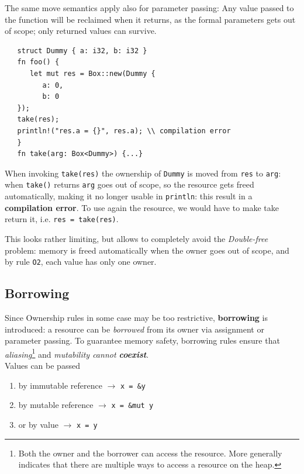 The same move semantics apply also for parameter passing:
Any value passed to the function will be reclaimed
when it returns, as the formal parameters gets out of
scope;
only returned values can survive.
\begin{lstlisting}
   struct Dummy { a: i32, b: i32 }
   fn foo() {
      let mut res = Box::new(Dummy {
         a: 0,
         b: 0
   });
   take(res);
   println!("res.a = {}", res.a); \\ compilation error
   }
   fn take(arg: Box<Dummy>) {...}
\end{lstlisting}

When invoking \lstinline|take(res)| the ownership of \lstinline|Dummy| is moved from \lstinline|res| to \lstinline|arg|:
when \texttt{take()} returns \lstinline|arg| goes out of scope, so the resource gets freed automatically, making it no longer usable in \lstinline|println|:
this result in a \textbf{compilation error}.
To use again the resource, we would have to make take return it, i.e. \lstinline|res = take(res)|.

This looks rather limiting, but allows to completely avoid the \textit{Double-free} problem:
memory is freed automatically
when the owner goes out of scope, and by rule \texttt{O2}, each value has only one owner.

\subsection{Borrowing}
Since Ownership rules in some case may be too restrictive, \textbf{borrowing} is introduced: a resource can be \textit{borrowed} from its owner via
assignment or parameter passing.
To guarantee memory safety, borrowing rules ensure
that \textit{aliasing}\footnote{Both the owner and the borrower can access the resource.
More generally indicates that there are multiple ways to access a resource on the heap.} and \textit{mutability cannot \textbf{coexist}}.\\
Values can be passed
\begin{enumerate}
   \item by immutable reference $\longrightarrow$ \lstinline|x = &y|
   \item by mutable reference $\longrightarrow$ \lstinline|x = &mut y|
   \item or by value $\longrightarrow$ \lstinline|x = y|
\end{enumerate}

